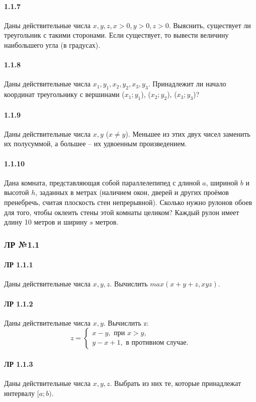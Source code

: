 \documentclass[12pt,a4paper]{report}
\begin{document}
\paragraph*{1.1.7} Даны действительные числа $x, y, z, x > 0, y > 0, z > 0$. Выяснить, существует ли треугольник с такими сторонами. Если существует, то вывести величину наибольшего угла (в градусах).
\paragraph*{1.1.8} Даны действительные числа $x_1, y_1, x_2, y_2, x_3, y_3$. Принадлежит ли начало координат треугольнику с вершинами ($x_1;y_1$), ($x_2;y_2$), ($x_3;y_3$)?
\paragraph*{1.1.9} Даны действительные числа $x, y$ ($x \neq y$). Меньшее из этих двух чисел заменить их полусуммой, а большее -- их удвоенным произведением. 
\paragraph*{1.1.10} Дана комната, представляющая собой параллелепипед с длиной $a$, шириной $b$ и высотой $h$, заданных в метрах (наличием окон, дверей и других проёмов пренебречь, считая плоскость стен непрерывной). Сколько нужно рулонов обоев для того, чтобы оклеить стены этой комнаты целиком? Каждый рулон имеет длину 10 метров и ширину $s$ метров.


\clearpage
\subsubsection*{ЛР №1.1}
\paragraph*{ЛР 1.1.1} Даны действительные числа $x, y, z$. Вычислить $max(x+y+z, xyz)$.
\paragraph*{ЛР 1.1.2} Даны действительные числа $x, y$. Вычислить z:
\begin{equation*}
 z = 
 \begin{cases}
   x - y, \text{ при } x > y, \\
   y - x + 1, \text{ в противном случае}.
 \end{cases}
\end{equation*}
\paragraph*{ЛР 1.1.3} Даны действительные числа $x, y, z$. Выбрать из них те, которые принадлежат интервалу $[a; b)$.
\end{document}

